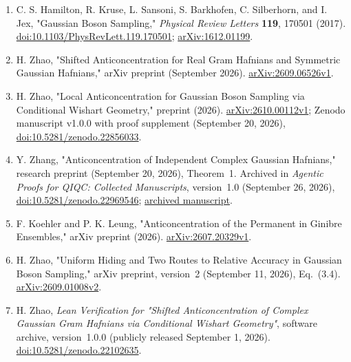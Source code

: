 \begin{enumerate}[label={},leftmargin=4.8em,labelsep=0.5em]
  \footnotesize
  \item[\textup{[HKS+17]}]\label{ref:hac-hamilton}
  C. S. Hamilton, R. Kruse, L. Sansoni, S. Barkhofen, C. Silberhorn, and I. Jex, "Gaussian Boson Sampling," \emph{Physical Review Letters} \textbf{119}, 170501 (2017). \href{https://doi.org/10.1103/PhysRevLett.119.170501}{doi:10.1103/PhysRevLett.119.170501}; \href{https://arxiv.org/abs/1612.01199}{arXiv:1612.01199}.

  \item[\textup{[Zha26]}]\label{ref:hac-zhao}
  H. Zhao, "Shifted Anticoncentration for Real Gram Hafnians and Symmetric Gaussian Hafnians," arXiv preprint (September 2026). \href{https://arxiv.org/abs/2609.06526v1}{arXiv:2609.06526v1}.

  \item[\textup{[Zhao26]}]\label{ref:hac-zhao-complex}
  H. Zhao, "Local Anticoncentration for Gaussian Boson Sampling via Conditional Wishart Geometry," preprint (2026). \href{https://arxiv.org/abs/2610.00112v1}{arXiv:2610.00112v1}; Zenodo manuscript v1.0.0 with proof supplement (September 20, 2026), \href{https://doi.org/10.5281/zenodo.22856033}{doi:10.5281/zenodo.22856033}.

  \item[\textup{[Zhang26]}]\label{ref:hac-zhang}
  Y. Zhang, "Anticoncentration of Independent Complex Gaussian Hafnians," research preprint (September 20, 2026), Theorem~1. Archived in \emph{Agentic Proofs for QIQC: Collected Manuscripts}, version~1.0 (September 26, 2026), \href{https://doi.org/10.5281/zenodo.22969546}{doi:10.5281/zenodo.22969546}; \href{https://zenodo.org/records/22969546/files/complex-gaussian-hafnian.pdf}{archived manuscript}.

  \item[\textup{[KL26]}]\label{ref:hac-koehler-leung}
  F. Koehler and P. K. Leung, "Anticoncentration of the Permanent in Ginibre Ensembles," arXiv preprint (2026). \href{https://arxiv.org/abs/2607.20329v1}{arXiv:2607.20329v1}.

  \item[\textup{[Zhao26H]}]\label{ref:hac-zhao-hiding}
  H. Zhao, "Uniform Hiding and Two Routes to Relative Accuracy in Gaussian Boson Sampling," arXiv preprint, version~2 (September 11, 2026), Eq.~(3.4). \href{https://arxiv.org/abs/2609.01008v2}{arXiv:2609.01008v2}.

  \item[\textup{[Zhao26L]}]\label{ref:hac-zhao-lean}
  H. Zhao, \emph{Lean Verification for "Shifted Anticoncentration of Complex Gaussian Gram Hafnians via Conditional Wishart Geometry"}, software archive, version~1.0.0 (publicly released September 1, 2026). \href{https://doi.org/10.5281/zenodo.22102635}{doi:10.5281/zenodo.22102635}.
\end{enumerate}

